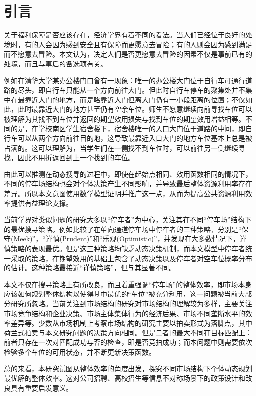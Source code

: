 \documentclass{thuemp}
\begin{document}
\section{引言}
\par 关于福利保障是否应该存在，经济学界有着不同的看法。当人们已经位于良好的处境时，有的人会因为感到安全且有保障而更愿意去冒险；有的人则会因为感到满足而不愿意去冒险。本文认为，决定人们是否更愿意去冒险的因素不仅是事前已有的处境，而且与事后的备选项有关。
\par 例如在清华大学某办公楼门口曾有一现象：唯一的办公楼大门位于自行车可通行道路的尽头，即自行车只能从一个方向前往大门。但此时自行车停车的聚集处并不集中在最靠近大门的地方，而是略靠近大门但离大门仍有一小段距离的位置；不仅如此，此时最靠近大门的地方甚至仍有空余车位。师生不愿意继续向前寻找车位可以被理解为其找不到车位并返回的期望效用损失与找到车位的期望效用增益相等。不同的是，在学校南区学生宿舍楼下，宿舍楼唯一的入口大门位于道路的中间，即自行车可以从两个方向前往目的地，这导致最靠近入口大门的地方车位基本上总是被占满的。这可以理解为，当学生们在一侧找不到车位时，可以前往另一侧继续寻找，因此不用折返回到上一个找到的车位。
\par 由此可以推测在动态搜寻的过程中，即使在起始点相同、效用函数相同的情况下，不同的停车场结构也会对个体决策产生不同影响，并导致最后整体资源利用率存在差异。所以本文意图使用数学模型证明并推广这一点，从而为提高公共资源利用效率提供有益理论支撑。
\par 当前学界对类似问题的研究大多以“停车者”为中心，关注其在不同“停车场”结构下的最优搜寻策略。例如\citet*{krapivsky_simpleparkingstrategies_2019}比较了在单向通道停车场中停车者的三种策略，分别是“保守(Meek)”，“谨慎(Prudent)”和“乐观(Optimistic)”，并发现在大多数情况下，谨慎策略的表现最优。但是这三种策略均缺乏动态决策机制，而本文模型中停车者统一采取的策略，在期望效用的基础上包含了动态决策以及停车者对空车位概率分布的估计。这种策略最接近“谨慎策略”，但与其显著不同。
\enlargethispage{-1cm}
\par 本文不仅在搜寻策略上有所改良，而且着重强调“停车场”的整体效率，即市场本身应该如何规划整体结构以使得其中最优的“车位”被充分利用，这一问题被当前大部分研究所忽略。当前关注到市场结构的研究对市场结构的理解较为多样，主要关注市场竞争结构和企业决策\citep*{bar-isaac_searchdesignmarket_2012, DuChuang_pingtaineishichangjiegoushejijianlunwangshangwaimaishangyemoshiyuguanzhi_2024}、市场主体集体行为的经济后果\citep{becker_irrationalbehavioreconomic_1962}、市场不同垄断水平的效率差异\citep{MengShanShan_shichangjiegouchuangxinshouyigongyinglianfenpeiyuchanyefazhan_2024a}等。少数从市场机制上考察市场结构的研究主要以拍卖形式为落脚点\citep{lucking-reiley_usingfieldexperiments_1999}，其中荷兰式拍卖与本文研究问题的决策方向相同。但是二者的最大不同在目标匹配上：前者只存在一次对匹配成功与否的检查，即是否竞拍成功；而本问题中则需要依次检验多个车位的可用状态，并不断更新决策函数。
\par 总的来看，本研究试图从整体效率的角度出发，探究不同市场结构下个体动态规划最优解的整体效率。这对公司招聘、高校招生等信息不对称场景下的政策设计和改良具有重要启发意义。
\end{document}
